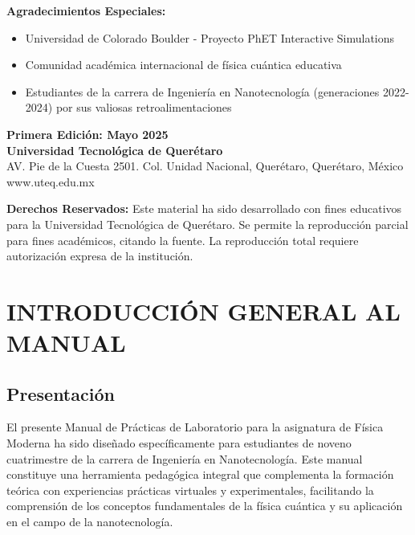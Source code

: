 \documentclass[12pt,a4paper]{book}
\begin{document}
	\vspace{1cm}
	
	\textbf{Agradecimientos Especiales:}
	\begin{itemize}[leftmargin=2cm]
		\item Universidad de Colorado Boulder - Proyecto PhET Interactive Simulations
		\item Comunidad académica internacional de física cuántica educativa
		\item Estudiantes de la carrera de Ingeniería en Nanotecnología (generaciones 2022-2024) por sus valiosas retroalimentaciones
	\end{itemize}
	
	\vspace{1cm}
	
	\begin{center}
		\textbf{Primera Edición: Mayo 2025}\\
		\textbf{Universidad Tecnológica de Querétaro}\\
	AV. Pie de la Cuesta 2501. Col. Unidad Nacional, Querétaro, Querétaro, México  \\
		www.uteq.edu.mx
	\end{center}
	
	\vspace{1cm}
	
	\begin{tcolorbox}[colback=gray!10!white,colframe=gray]
		\textbf{Derechos Reservados:} Este material ha sido desarrollado con fines educativos para la Universidad Tecnológica de Querétaro. Se permite la reproducción parcial para fines académicos, citando la fuente. La reproducción total requiere autorización expresa de la institución.
	\end{tcolorbox}
	
	\newpage
	
	\tableofcontents
	
	\chapter{INTRODUCCIÓN GENERAL AL MANUAL}
	
	\section{Presentación}
	
	El presente Manual de Prácticas de Laboratorio para la asignatura de Física Moderna ha sido diseñado específicamente para estudiantes de noveno cuatrimestre de la carrera de Ingeniería en Nanotecnología. Este manual constituye una herramienta pedagógica integral que complementa la formación teórica con experiencias prácticas virtuales y experimentales, facilitando la comprensión de los conceptos fundamentales de la física cuántica y su aplicación en el campo de la nanotecnología.
	
\end{document}
